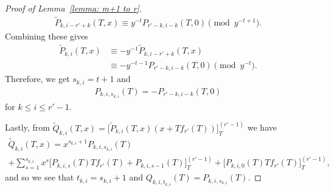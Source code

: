 \documentclass[10pt,a4paper]{amsart}
\begin{document}
\begin{proof}[Proof of Lemma~\ref{lemma: m+1 to r}]
\begin{align*}
        \tilde P_{k,i-r'+k}(T,x)
        \equiv
        y^{-t}P_{r'-k,i-k}(T,0) \pmod{y^{-t+1}}.
    \end{align*}
Combining these gives
    \begin{align*}
        \tilde P_{k,i}(T,x)
        &\equiv -y^{-1}\tilde P_{k,i-r'+k}(T,x)
        \\&\equiv
        -y^{-t-1}P_{r'-k,i-k}(T,0) \pmod{y^{-t}}.
    \end{align*}
Therefore, we get $s_{k,i}=t+1$ and
    \begin{align*}
        P_{k,i,s_{k,i}}(T)=-P_{r'-k,i-k}(T,0)
    \end{align*}
for $k\leq i\leq r'-1$.

Lastly, from $\tilde Q_{k,i}(T,x)=\big[\tilde P_{k,i}(T,x)(x+Tf_{r'}(T))\big]_{T}^{(r'-1)}$ we have
    \begin{multline*}
        \tilde Q_{k,i}(T,x)=
        x^{s_{k,i}+1} P_{k,i,s_{k,i}}(T)\\ +\sum_{s=1}^{s_{k,i}}x^s\big[P_{k,i,s}(T)Tf_{r'}(T)+P_{k,i,s-1}(T)\big]_{T}^{(r'-1)}
        +\big[P_{k,i,0}(T)Tf_{r'}(T)\big]_{T}^{(r'-1)},
    \end{multline*}
and so we see that $t_{k,i}=s_{k,i}+1$ and $Q_{k,i,t_{k,i}}(T)=P_{k,i,s_{k,i}}(T)$.
\end{proof}
\end{document}
